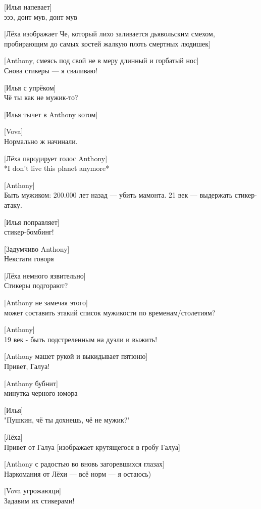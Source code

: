 [Илья напевает]\\
эээ, донт мув, донт мув


[Лёха изображает Че, который лихо заливается дьявольским смехом, пробирающим до самых костей жалкую плоть смертных людишек]


[Anthony, смеясь под свой не в меру длинный и горбатый нос]\\
Снова стикеры --- я сваливаю!


[Илья с упрёком]\\
Чё ты как не мужик-то?


[Илья тычет в Anthony котом]


[Vova]\\
Нормально ж начинали.


[Лёха пародирует голос Anthony]\\
*I don't live this planet anymore*


[Anthony]\\
Быть мужиком: 200.000 лет назад --- убить мамонта. 21 век --- выдержать стикер-атаку.


[Илья поправляет]\\
стикер-бомбинг!


[Задумчиво Anthony]\\
Некстати говоря


[Лёха немного язвительно]\\
Стикеры подгорают?


[Anthony не замечая этого]\\
может составить этакий список мужикости по временам/столетиям?


[Anthony]\\
19 век - быть подстреленным на дуэли и выжить!


[Anthony машет рукой и выкидывает пятюню]\\
Привет, Галуа!


[Anthony бубнит]\\
минутка черного юмора


[Илья]\\
"Пушкин, чё ты дохнешь, чё не мужик?"


[Лёха]\\
Привет от Галуа
[изображает крутящегося в гробу Галуа]


[Anthony с радостью во вновь загоревшихся глазах]\\
Наркомания от Лёхи --- всё норм --- я остаюсь)


[Vova угрожающи]\\
Задавим их стикерами!


